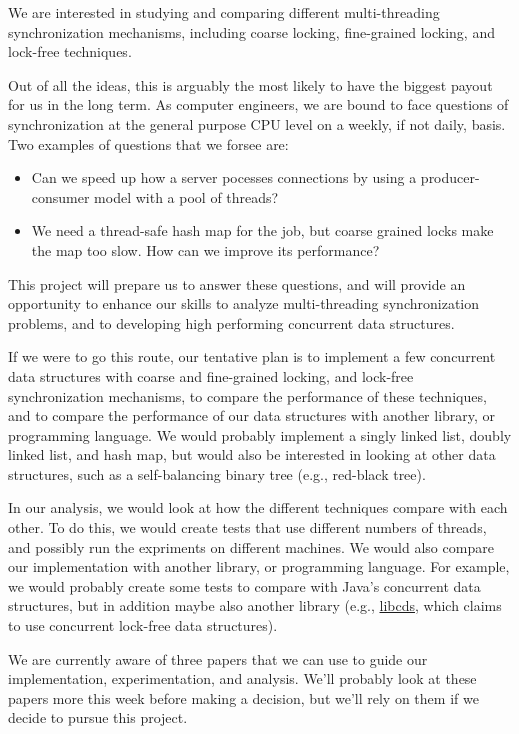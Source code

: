 \documentclass[11pt]{article}
\begin{document}
We are interested in studying and comparing different multi-threading
synchronization mechanisms, including coarse locking, fine-grained locking, and
lock-free techniques.

Out of all the ideas, this is arguably the most likely to have the biggest
payout for us in the long term. As computer engineers, we are bound to face
questions of synchronization at the general purpose CPU level on a weekly, if
not daily, basis. Two examples of questions that we forsee are:

\begin{itemize}
\item
Can we speed up how a server pocesses connections by using a producer-consumer
model with a pool of threads?
\item
We need a thread-safe hash map for the job, but coarse grained locks make the
map too slow. How can we improve its performance?
\end{itemize}

This project will prepare us to answer these questions, and will provide an
opportunity to enhance our skills to analyze multi-threading synchronization
problems, and to developing high performing concurrent data structures.

If we were to go this route, our tentative plan is to implement a few concurrent
data structures with coarse and fine-grained locking, and lock-free
synchronization mechanisms, to compare the performance of these techniques, and
to compare the performance of our data structures with another library, or
programming language. We would probably implement a singly linked list, doubly
linked list, and hash map, but would also be interested in looking at other
data structures, such as a self-balancing binary tree (e.g., red-black tree).

In our analysis, we would look at how the different techniques compare with each
other. To do this, we would create tests that use different numbers of threads,
and possibly run the expriments on different machines. We would also compare our
implementation with another library, or programming language. For example, we
would probably create some tests to compare with Java's concurrent data
structures, but in addition maybe also another library (e.g.,
\href{https://github.com/khizmax/libcds}{libcds}, which claims to use concurrent
lock-free data structures).

We are currently aware of three papers \cite{Harris, Fomitchev, Maged} that we
can use to guide our implementation, experimentation, and analysis. We'll
probably look at these papers more this week before making a decision, but we'll
rely on them if we decide to pursue this project.
\end{document}
